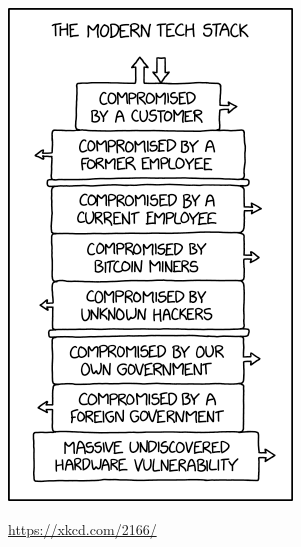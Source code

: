\documentclass{slide}
\begin{document}
\begin{frame}

\begin{figure}
    \href{https://xkcd.com/2166/}{\includegraphics[height=\paperheight-11mm]{./security_stack.png}}
    \caption{\url{https://xkcd.com/2166/}}
\end{figure}

\end{frame}


\end{document}
